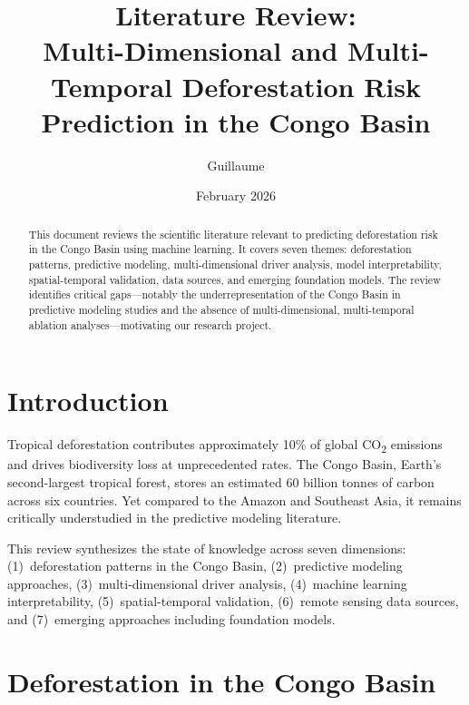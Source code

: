 \documentclass[11pt,a4paper]{article}
\title{Literature Review:\\Multi-Dimensional and Multi-Temporal Deforestation Risk Prediction in the Congo Basin}
\author{Guillaume}
\date{February 2026}
\begin{document}
\maketitle

\begin{abstract}
This document reviews the scientific literature relevant to predicting deforestation risk in the Congo Basin using machine learning. It covers seven themes: deforestation patterns, predictive modeling, multi-dimensional driver analysis, model interpretability, spatial-temporal validation, data sources, and emerging foundation models. The review identifies critical gaps---notably the underrepresentation of the Congo Basin in predictive modeling studies and the absence of multi-dimensional, multi-temporal ablation analyses---motivating our research project.
\end{abstract}

\tableofcontents
\newpage

\section{Introduction}

Tropical deforestation contributes approximately 10\% of global CO\textsubscript{2} emissions and drives biodiversity loss at unprecedented rates. The Congo Basin, Earth's second-largest tropical forest, stores an estimated 60 billion tonnes of carbon across six countries. Yet compared to the Amazon and Southeast Asia, it remains critically understudied in the predictive modeling literature.

This review synthesizes the state of knowledge across seven dimensions: (1)~deforestation patterns in the Congo Basin, (2)~predictive modeling approaches, (3)~multi-dimensional driver analysis, (4)~machine learning interpretability, (5)~spatial-temporal validation, (6)~remote sensing data sources, and (7)~emerging approaches including foundation models.

\section{Deforestation in the Congo Basin}
\end{document}
